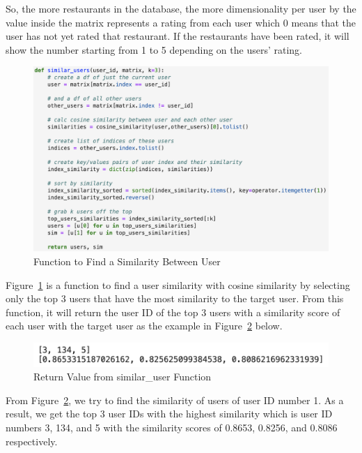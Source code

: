 \documentclass[12pt,oneside,openright,a4paper]{cpe-english-project}
\begin{document}
So, the more restaurants in the database, the more dimensionality per user by the value inside the matrix represents a rating from each user which 0 means that the user has not yet rated that restaurant. If the restaurants have been rated, it will show the number starting from 1 to 5 depending on the users’ rating.

\begin{figure}[H]\centering
\includegraphics[width=350pt]{./images/4FunctiontoFindaSimilarityBetweenUser.png}
\caption{Function to Find a Similarity Between User}\label{fig:4FunctiontoFindaSimilarityBetweenUser}
\end{figure}

Figure~\ref{fig:4FunctiontoFindaSimilarityBetweenUser} is a function to find a user similarity with cosine similarity by selecting only the top 3 users that have the most similarity to the target user. From this function, it will return the user ID of the top 3 users with a similarity score of each user with the target user as the example in Figure~\ref{fig:4ReturnValuefromsimilaruesrFunction} below.

\begin{figure}[H]\centering
\includegraphics[width=350pt]{./images/4ReturnValuefromsimilar_uesrFunction.png}
\caption{Return Value from similar\_user Function}\label{fig:4ReturnValuefromsimilaruesrFunction}
\end{figure}

From Figure~\ref{fig:4ReturnValuefromsimilaruesrFunction}, we try to find the similarity of users of user ID number 1. As a result, we get the top 3 user IDs with the highest similarity which is user ID numbers 3, 134, and 5 with the similarity scores of 0.8653, 0.8256, and 0.8086 respectively.
\end{document}
